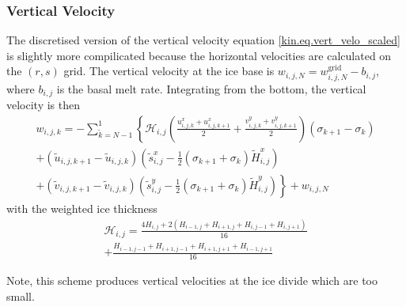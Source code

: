 \subsubsection{Vertical Velocity}
The discretised version of the vertical velocity equation \eqref{kin.eq.vert_velo_scaled} is slightly more compilicated because the horizontal velocities are calculated on the $(r,s)$ grid. The vertical velocity at the ice base is $w_{i,j,N}=w^{\text{grid}}_{i,j,N}-b_{i,j}$, where $b_{i,j}$ is the basal melt rate. Integrating from the bottom, the vertical velocity is then
\begin{equation}
  \begin{split}
  w_{i,j,k}=-\sum_{\tilde{k}=N-1}^1\left\{\mathcal{H}_{i,j}\left(\frac{u^x_{i,j,k}+u^x_{i,j,k+1}}{2}+\frac{v^y_{i,j,k}+v^y_{i,j,k+1}}{2}\right)(\sigma_{k+1}-\sigma_k)\right. \\
     +(\tilde{u}_{i,j,k+1}-\tilde{u}_{i,j,k})  \left(\tilde{s}^x_{i,j}-\frac12(\sigma_{k+1}+\sigma_k)\tilde{H}^x_{i,j}\right)  \\
     \left.+(\tilde{v}_{i,j,k+1}-\tilde{v}_{i,j,k})  \left(\tilde{s}^y_{i,j}-\frac12(\sigma_{k+1}+\sigma_k)\tilde{H}^y_{i,j}\right)\right\} + w_{i,j,N}
  \end{split}
\end{equation}
with the weighted ice thickness
\begin{equation*}
  \begin{split}
  \mathcal{H}_{i,j}=\frac{4H_{i,j}+2(H_{i-1,j}+H_{i+1,j}+H_{i,j-1}+H_{i,j+1})}{16}\\
  +\frac{H_{i-1,j-1}+H_{i+1,j-1}+H_{i+1,j+1}+H_{i-1,j+1}}{16}    
  \end{split}
\end{equation*}

Note, this scheme produces vertical velocities at the ice divide which are too small.